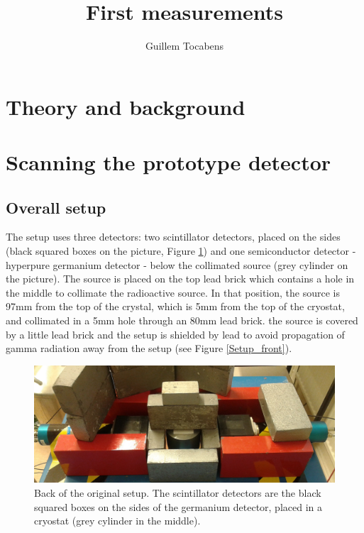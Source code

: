 \documentclass[11pt,a4paper]{article}
\author{Guillem Tocabens}
\title{First measurements}
\begin{document}
\section{Theory and background} \label{theory}

\section{Scanning the prototype detector}

\subsection{Overall setup} \label{setup}

The setup uses three detectors: two scintillator detectors, placed on the sides (black squared boxes on the picture, Figure \ref{Setup}) and one semiconductor detector - hyperpure germanium detector - below the collimated source (grey cylinder on the picture). The source is placed on the top lead brick which contains a hole in the middle to collimate the radioactive source. In that position, the source is 97mm from the top of the crystal, which is 5mm from the top of the cryostat, and collimated in a 5mm hole through an 80mm lead brick. the source is covered by a little lead brick and the setup is shielded by lead to avoid propagation of gamma radiation away from the setup (see Figure \ref{Setup_front}).

\begin{figure}[!h]
\centering
\includegraphics[scale=0.15]{New_setup_back.jpg}
\caption{Back of the original setup. The scintillator detectors are the black squared boxes on the sides of the germanium detector, placed in a cryostat (grey cylinder in the middle).}
\label{Setup}
\end{figure}
\end{document}

